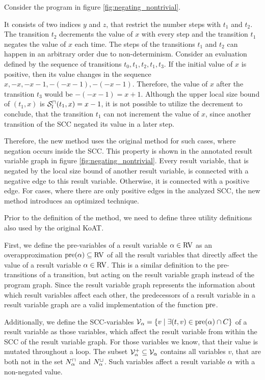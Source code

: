 Consider the program in figure \ref{fig:negating_nontrivial}.



It consists of two indices $y$ and $z$, that restrict the number steps with $t_1$ and $t_2$.
The transition $t_2$ decrements the value of $x$ with every step and the transition $t_1$ negates the value of $x$ each time.
The steps of the transitions $t_1$ and $t_2$ can happen in an arbitrary order due to non-determinism.
Consider an evaluation defined by the sequence of transitions $t_0, t_1, t_2, t_1, t_3$.
If the initial value of $x$ is positive, then its value changes in the sequence $x, -x, -x-1, -(-x-1), -(-x-1)$.
Therefore, the value of $x$ after the transition $t_3$ would be $-(-x-1) = x+1$.
Although the upper local size bound of $(t_1,x)$ is ${\mathcal{S}^\sqcap_l}(t_1,x) = x-1$, it is not possible to utilize the decrement to conclude, that the transition $t_1$ can not increment the value of $x$, since another transition of the SCC negated its value in a later step.

Therefore, the new method uses the original method for such cases, where negation occurs inside the SCC.
This property is shown in the annotated result variable graph in figure \ref{fig:negating_nontrivial}.
Every result variable, that is negated by the local size bound of another result variable, is connected with a negative edge to this result variable.
Otherwise, it is connected with a positive edge.
For cases, where there are only positive edges in the analyzed SCC, the new method introduces an optimized technique.

Prior to the definition of the method, we need to define three utility definitions also used by the original KoAT.

First, we define the pre-variables of a result variable $\alpha \in \text{RV}$ as an overapproximation $\text{pre}(\alpha) \subseteq \text{RV}$ of all the result variables that directly affect the value of a result variable $\alpha \in \text{RV}$.
This is a similar definition to the pre-transitions of a transition, but acting on the result variable graph instead of the program graph.
Since the result variable graph represents the information about which result variables affect each other, the predecessors of a result variable in a result variable graph are a valid implementation of the function $\text{pre}$.

Additionally, we define the SCC-variables $\mathcal{V}_\alpha = \lbrace  v \mid \exists (t, v) \in \text{pre}(\alpha) \cap C  \rbrace$ of a result variable as those variables, which affect the result variable from within the SCC of the result variable graph.
For those variables we know, that their value is mutated throughout a loop.
The subset $\mathcal{V}^+_\alpha \subseteq \mathcal{V}_\alpha$ contains all variables $v$, that are both not in the set $N^\sqcap_\alpha$ and $N^\sqcup_\alpha$.
Such variables affect a result variable $\alpha$ with a non-negated value.

